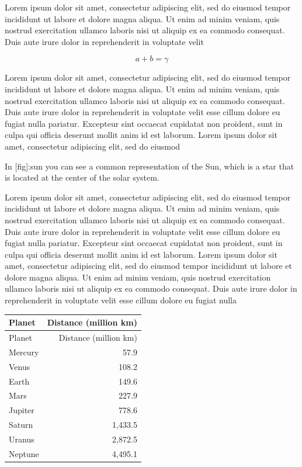Lorem ipsum dolor sit amet, consectetur adipiscing elit, sed do eiusmod
tempor incididunt ut labore et dolore magna aliqua. Ut enim ad minim
veniam, quis nostrud exercitation ullamco laboris nisi ut aliquip ex ea
commodo consequat. Duis aute irure dolor in reprehenderit in voluptate
velit

\[a + b = \gamma\]

Lorem ipsum dolor sit amet, consectetur adipiscing elit, sed do eiusmod
tempor incididunt ut labore et dolore magna aliqua. Ut enim ad minim
veniam, quis nostrud exercitation ullamco laboris nisi ut aliquip ex ea
commodo consequat. Duis aute irure dolor in reprehenderit in voluptate
velit esse cillum dolore eu fugiat nulla pariatur. Excepteur sint
occaecat cupidatat non proident, sunt in culpa qui officia deserunt
mollit anim id est laborum. Lorem ipsum dolor sit amet, consectetur
adipiscing elit, sed do eiusmod

In {[}fig{]}:sun you can see a common representation of the Sun, which
is a star that is located at the center of the solar system.

Lorem ipsum dolor sit amet, consectetur adipiscing elit, sed do eiusmod
tempor incididunt ut labore et dolore magna aliqua. Ut enim ad minim
veniam, quis nostrud exercitation ullamco laboris nisi ut aliquip ex ea
commodo consequat. Duis aute irure dolor in reprehenderit in voluptate
velit esse cillum dolore eu fugiat nulla pariatur. Excepteur sint
occaecat cupidatat non proident, sunt in culpa qui officia deserunt
mollit anim id est laborum. Lorem ipsum dolor sit amet, consectetur
adipiscing elit, sed do eiusmod tempor incididunt ut labore et dolore
magna aliqua. Ut enim ad minim veniam, quis nostrud exercitation ullamco
laboris nisi ut aliquip ex ea commodo consequat. Duis aute irure dolor
in reprehenderit in voluptate velit esse cillum dolore eu fugiat nulla

\begin{longtable}[]{@{}lr@{}}
\toprule\noalign{}
Planet & Distance (million km) \\
\midrule\noalign{}
\endhead
\bottomrule\noalign{}
\endlastfoot
Planet & Distance (million km) \\
Mercury & 57.9 \\
Venus & 108.2 \\
Earth & 149.6 \\
Mars & 227.9 \\
Jupiter & 778.6 \\
Saturn & 1,433.5 \\
Uranus & 2,872.5 \\
Neptune & 4,495.1 \\
\end{longtable}

